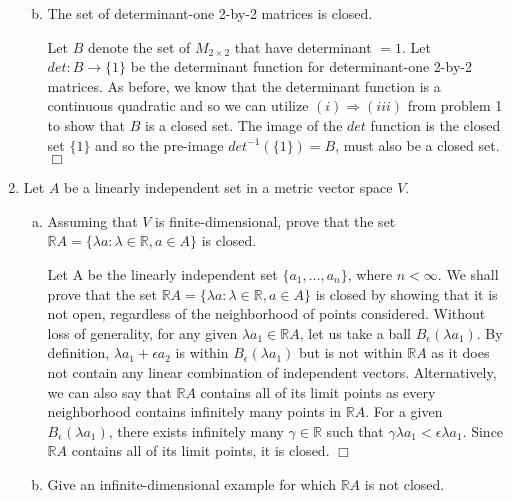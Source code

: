 \documentclass[12pt,letterpaper,reqno]{amsart}
\newcommand{\R}{\mathbb R}
\begin{document}
\begin{enumerate}[1.]
\begin{enumerate}[(a)]
\begin{flushleft}
\end{flushleft}
\item The set of determinant-one 2-by-2 matrices is closed.
\begin{flushleft}
Let $B$ denote the set of $M_{2\times2}$ that have determinant $= 1$.
Let $det: B \rightarrow \{1\}$ be the determinant function for determinant-one 2-by-2 matrices. As before, we know that the determinant function is a continuous quadratic and so we can utilize $(i) \Rightarrow (iii)$ from problem 1 to show that $B$ is a closed set. The image of the $det$ function is the closed set $\{1\}$ and so the pre-image $det^{-1}(\{1\}) = B$, must also be a closed set. $\Box$
\end{flushleft}
\end{enumerate}
\newpage
\item Let $A$ be a linearly independent set in a metric vector space $V$.
\begin{enumerate}[(a)]
\item Assuming that $V$ is finite-dimensional, prove that the set $\R A=\{\lambda a : \lambda \in \R, a\in A\}$ is closed.
\begin{flushleft}
Let A be the linearly independent set $\{a_1, \ldots, a_n \}$, where $n < \infty$. We shall prove that the set $\R A=\{\lambda a : \lambda \in \R, a\in A\}$ is closed by showing that it is not open, regardless of the neighborhood of points considered. Without loss of generality, for any given $\lambda a_1 \in \R A$, let us take a ball $B_\epsilon(\lambda a_1)$. By definition, $\lambda a_1 + \epsilon a_2$ is within $B_\epsilon(\lambda a_1)$ but is not within $\R A$ as it does not contain any linear combination of independent vectors. Alternatively, we can also say that $\R A$ contains all of its limit points as every neighborhood contains infinitely many points in $\R A$. For a given $B_\epsilon(\lambda a_1)$, there exists infinitely many $\gamma \in \R$ such that $\gamma \lambda a_1 < \epsilon \lambda a_1$. Since $\R A$ contains all of its limit points, it is closed. $\Box$
\end{flushleft}
\item Give an infinite-dimensional example for which $\R A$ is not closed.
\begin{flushleft}

\end{flushleft}
\end{enumerate}
\end{enumerate}
\end{document}
